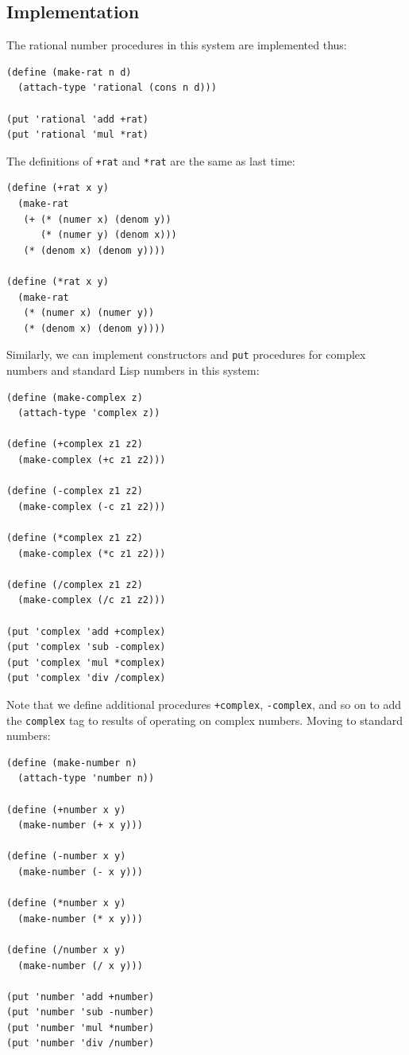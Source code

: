 \documentclass[9pt]{report}
\begin{document}
\subsection{Implementation}
\label{sec:orgc3bdc1f}

The rational number procedures in this system are implemented thus:

\begin{verbatim}
(define (make-rat n d)
  (attach-type 'rational (cons n d)))

(put 'rational 'add +rat)
(put 'rational 'mul *rat)
\end{verbatim}

The definitions of \texttt{+rat} and \texttt{*rat} are the same as last time:
\begin{verbatim}
(define (+rat x y)
  (make-rat
   (+ (* (numer x) (denom y))
      (* (numer y) (denom x)))
   (* (denom x) (denom y))))

(define (*rat x y)
  (make-rat
   (* (numer x) (numer y))
   (* (denom x) (denom y))))
\end{verbatim}

Similarly, we can implement constructors and \texttt{put} procedures for
complex numbers and standard Lisp numbers in this system:

\begin{verbatim}
(define (make-complex z)
  (attach-type 'complex z))

(define (+complex z1 z2)
  (make-complex (+c z1 z2)))

(define (-complex z1 z2)
  (make-complex (-c z1 z2)))

(define (*complex z1 z2)
  (make-complex (*c z1 z2)))

(define (/complex z1 z2)
  (make-complex (/c z1 z2)))

(put 'complex 'add +complex)
(put 'complex 'sub -complex)
(put 'complex 'mul *complex)
(put 'complex 'div /complex)
\end{verbatim}

Note that we define additional procedures \texttt{+complex}, \texttt{-complex},
and so on to add the \texttt{complex} tag to results of operating on
complex numbers. Moving to standard numbers:

\begin{verbatim}
(define (make-number n)
  (attach-type 'number n))

(define (+number x y)
  (make-number (+ x y)))

(define (-number x y)
  (make-number (- x y)))

(define (*number x y)
  (make-number (* x y)))

(define (/number x y)
  (make-number (/ x y)))

(put 'number 'add +number)
(put 'number 'sub -number)
(put 'number 'mul *number)
(put 'number 'div /number)
\end{verbatim}
\end{document}
